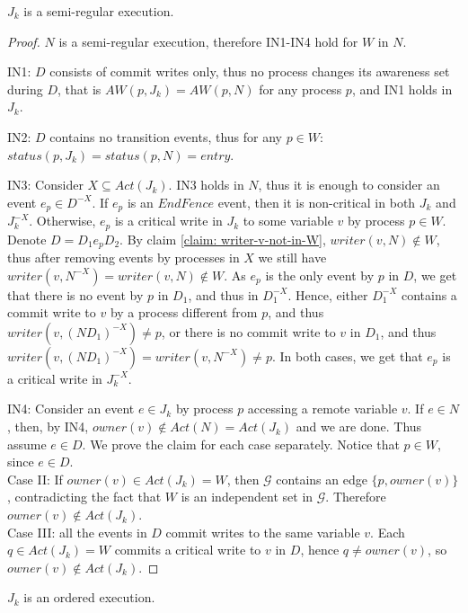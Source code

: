 \begin{claim-subsection} \label{J_k-semi-regular}
	$J_k$ is a semi-regular execution.
\end{claim-subsection}

\begin{proof}
	$N$ is a semi-regular execution, therefore IN1-IN4 hold for $W$ in $N$.
	
	IN1: $D$ consists of commit writes only, thus no process changes its awareness set during $D$, that is $AW(p,J_k) = AW(p,N)$ for any process $p$, and IN1 holds in $J_k$.
	
	IN2: $D$ contains no transition events, thus for any $p \in W$: $status(p,J_k) = status(p,N) = entry$.
	
	IN3: Consider $X \subseteq Act(J_k)$. IN3 holds in $N$, thus it is enough to consider an event $e_p \in D^{-X}$. If $e_p$ is an $EndFence$ event, then it is non-critical in both $J_k$ and $J_k^{-X}$. Otherwise, $e_p$ is a critical write in $J_k$ to some variable $v$ by process $p \in W$. Denote $D = D_1 e_p D_2$. By claim \ref{claim: writer-v-not-in-W}, $writer(v,N) \notin W$, thus after removing events by processes in $X$ we still have $writer(v,N^{-X}) = writer(v,N) \notin W$. As $e_p$ is the only event by $p$ in $D$, we get that there is no event by $p$ in $D_1$, and thus in $D_1^{-X}$. Hence, either $D_1^{-X}$ contains a commit write to $v$ by a process different from $p$, and thus $writer(v,(N D_1)^{-X}) \neq p$, or there is no commit write to $v$ in $D_1$, and thus $writer(v, (N D_1)^{-X}) = writer(v, N^{-X}) \neq p$. In both cases, we get that $e_p$ is a critical write in $J_k^{-X}$.
		
	IN4: Consider an event $e \in J_k$ by process $p$ accessing a remote variable $v$. If $e \in N$, then, by IN4, $owner(v) \notin Act(N) = Act(J_k)$ and we are done. Thus assume $e \in D$. We prove the claim for each case separately. Notice that $p \in W$, since $e \in D$.
	\\ Case II: If $owner(v) \in Act(J_k) = W$, then $\mathcal{G}$ contains an edge $\{p,owner(v)\}$, contradicting the fact that $W$ is an independent set in $\mathcal{G}$. Therefore $owner(v) \notin Act(J_k)$.
	\\ Case III: all the events in $D$ commit writes to the same variable $v$. Each $q \in Act(J_k) = W$ commits a critical write to $v$ in $D$, hence $q \neq owner(v)$, so $owner(v) \notin Act(J_k)$.
\end{proof}

\begin{claim-subsection} \label{J_k-ordered}
	$J_k$ is an ordered execution.
\end{claim-subsection}

